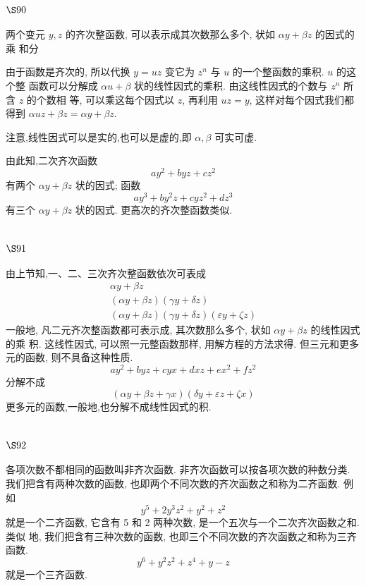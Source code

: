 \section{$\S 90$}

两个变元 $y, z$ 的齐次整函数, 可以表示成其次数那么多个, 状如 $\alpha y+\beta z$ 的因式的乘 和分

由于函数是齐次的, 所以代换 $y=u z$ 变它为 $z^{n}$ 与 $u$ 的一个整函数的乘积. $u$ 的这个整 函数可以分解成 $\alpha u+\beta$ 状的线性因式的乘积. 由这线性因式的个数与 $z^{n}$ 所含 $z$ 的个数相 等, 可以乘这每个因式以 $z$, 再利用 $u z=y$, 这样对每个因式我们都得到 $\alpha u z+\beta z=\alpha y+\beta z$. 

注意,线性因式可以是实的,也可以是虚的,即 $\alpha, \beta$ 可实可虚.

由此知,二次齐次函数
\[
a y^{2}+b y z+c z^{2}
\]
有两个 $\alpha y+\beta z$ 状的因式; 函数
\[
a y^{3}+b y^{2} z+c y z^{2}+d z^{3}
\]
有三个 $\alpha y+\beta z$ 状的因式. 更高次的齐次整函数类似.

\section{$\S 91$}

由上节知,一、二、三次齐次整函数依次可表成
\[
\begin{gathered}
\alpha y+\beta z \\
(\alpha y+\beta z)(\gamma y+\delta z) \\
(\alpha y+\beta z)(\gamma y+\delta z)(\varepsilon y+\zeta z)
\end{gathered}
\]
一般地, 凡二元齐次整函数都可表示成, 其次数那么多个, 状如 $\alpha y+\beta z$ 的线性因式的乘 积. 这线性因式, 可以照一元整函数那样, 用解方程的方法求得. 但三元和更多元的函数, 则不具备这种性质.
\[
a y^{2}+b y z+c y x+d x z+e x^{2}+f z^{2}
\]
分解不成
\[
(\alpha y+\beta z+\gamma x)(\delta y+\varepsilon z+\zeta x)
\]
更多元的函数,一般地,也分解不成线性因式的积.

\section{$\S 92$}

各项次数不都相同的函数叫非齐次函数. 非齐次函数可以按各项次数的种数分类. 我们把含有两种次数的函数, 也即两个不同次数的齐次函数之和称为二齐函数. 例如
\[
y^{5}+2 y^{3} z^{2}+y^{2}+z^{2}
\]
就是一个二齐函数, 它含有 5 和 2 两种次数, 是一个五次与一个二次齐次函数之和. 类似 地, 我们把含有三种次数的函数, 也即三个不同次数的齐次函数之和称为三齐函数.
\[
y^{6}+y^{2} z^{2}+z^{4}+y-z
\]
就是一个三齐函数.

